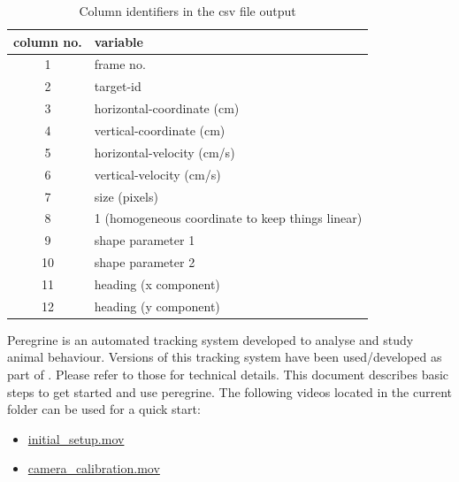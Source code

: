 \documentclass[11pt]{article}
\begin{document}
\begin{table}[t]
\caption{Column identifiers in the csv file output}
\begin{center}
\begin{tabular}[t]{cl}
\hline
column no. &  variable \\
\hline
1 & frame  no. \\
2 & target-id \\
3 &  horizontal-coordinate (cm) \\
4 & vertical-coordinate (cm) \\
5 &  horizontal-velocity (cm/s) \\
6 &  vertical-velocity (cm/s) \\
7 &  size (pixels) \\
8& 1 (homogeneous coordinate to keep things linear) \\
9  &shape parameter 1\\
10 &  shape parameter 2\\
11 &  heading (x component) \\
12 &  heading (y component) \\
\end{tabular}
\end{center}
\label{tab:csvcolumns}
\end{table}

Peregrine is an automated tracking system developed to analyse and study animal behaviour. Versions of this tracking system have been used/developed as part of \cite{Butail2011,Butail2012b,Butail2012c, Butail2013c, Ladu2014, Bartolini2015}. Please refer to those for technical details. This document describes basic steps to get started and use peregrine. The following videos located in the current folder can be used for a quick start:
\begin{itemize}
\item \href{run:initial\_setup.mov}{initial\_setup.mov}
\item \href{run:camera\_calibration.mov}{camera\_calibration.mov}
\end{itemize}
\end{document}
